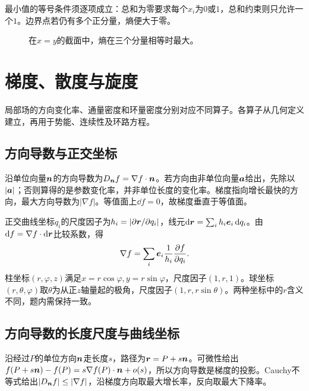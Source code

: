 \begin{solution}
最小值的等号条件须逐项成立：总和为零要求每个$x_i$为$0$或$1$，总和约束则只允许一个$1$。边界点若仍有多个正分量，熵便大于零。

\begin{figure}[H]\centering
{}
\caption{在$x=y$的截面中，熵在三个分量相等时最大。}\label{fig:c3-e6-s}
\end{figure}
\end{solution}


\section{梯度、散度与旋度}\label{sec:c3-fields}
局部场的方向变化率、通量密度和环量密度分别对应不同算子。各算子从几何定义建立，再用于势能、连续性及环路方程。

\subsection{方向导数与正交坐标}
沿单位向量$\bm{n}$的方向导数为$D_{\bm{n}}f=\nabla f\cdot\bm{n}$。若方向由非单位向量$\bm{a}$给出，先除以$|\bm{a}|$；否则算得的是参数变化率，并非单位长度的变化率。梯度指向增长最快的方向，最大方向导数为$|\nabla f|$。等值面上$\dd f=0$，故梯度垂直于等值面。

正交曲线坐标$q_i$的尺度因子为$h_i=|\partial\bm{r}/\partial q_i|$，线元$\mathop{}\!\mathrm d\bm{r}=\sum_i h_i\bm{e}_i\mathop{}\!\mathrm d q_i$。由$\mathop{}\!\mathrm d f=\nabla f\cdot\mathop{}\!\mathrm d\bm{r}$比较系数，得
\[\nabla f=\sum_i\bm{e}_i\frac1{h_i}\frac{\partial f}{\partial q_i}.\]
柱坐标$(r,\varphi,z)$满足$x=r\cos\varphi,y=r\sin\varphi$，尺度因子$(1,r,1)$。球坐标$(r,\theta,\varphi)$取$\theta$为从正$z$轴量起的极角，尺度因子$(1,r,r\sin\theta)$。两种坐标中的$r$含义不同，题内需保持一致。

\subsection{方向导数的长度尺度与曲线坐标}
沿经过$P$的单位方向$\bm{n}$走长度$s$，路径为$\bm{r}=P+s\bm{n}$。可微性给出$f(P+s\bm{n})-f(P)=s\nabla f(P)\cdot\bm{n}+o(s)$，所以方向导数是梯度的投影。Cauchy不等式给出$|D_{\bm{n}}f|\le|\nabla f|$，沿梯度方向取最大增长率，反向取最大下降率。

